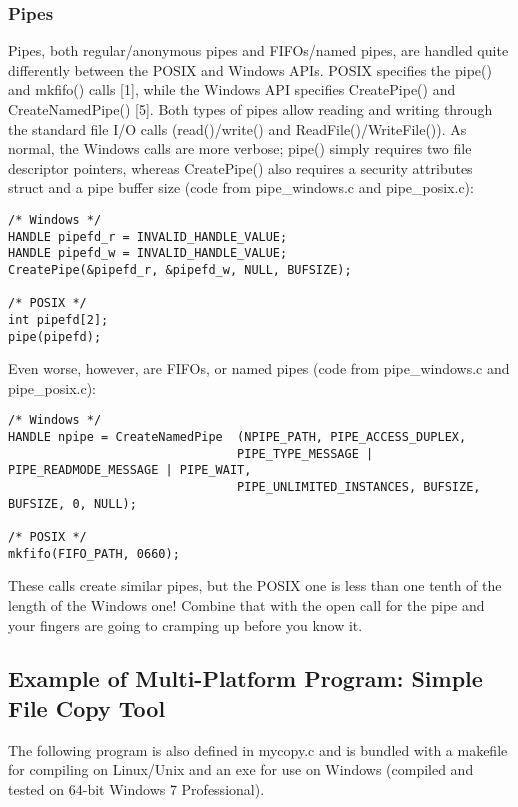 \documentclass[letterpaper,10pt,fleqn]{article}
\numberwithin{equation}{section}
\begin{document}
\subsubsection*{Pipes}
Pipes, both regular/anonymous pipes and FIFOs/named pipes, are handled quite differently between the POSIX and Windows APIs.  POSIX specifies the pipe() and mkfifo() calls {[}1{]}, while the Windows API specifies CreatePipe() and CreateNamedPipe() {[}5{]}.  Both types of pipes allow reading and writing through the standard file I/O calls (read()/write() and ReadFile()/WriteFile()).  As normal, the Windows calls are more verbose; pipe() simply requires two file descriptor pointers, whereas CreatePipe() also requires a security attributes struct and a pipe buffer size (code from pipe\_windows.c and pipe\_posix.c):
\begin{verbatim}
/* Windows */
HANDLE pipefd_r = INVALID_HANDLE_VALUE;
HANDLE pipefd_w = INVALID_HANDLE_VALUE;
CreatePipe(&pipefd_r, &pipefd_w, NULL, BUFSIZE);

/* POSIX */
int pipefd[2];
pipe(pipefd);
\end{verbatim}
Even worse, however, are FIFOs, or named pipes (code from pipe\_windows.c and pipe\_posix.c):
\begin{verbatim}
/* Windows */
HANDLE npipe = CreateNamedPipe  (NPIPE_PATH, PIPE_ACCESS_DUPLEX,
                                PIPE_TYPE_MESSAGE | PIPE_READMODE_MESSAGE | PIPE_WAIT,
                                PIPE_UNLIMITED_INSTANCES, BUFSIZE, BUFSIZE, 0, NULL);

/* POSIX */
mkfifo(FIFO_PATH, 0660);
\end{verbatim}
These calls create similar pipes, but the POSIX one is less than one tenth of the length of the Windows one!  Combine that with the open call for the pipe and your fingers are going to cramping up before you know it.

\subsection*{Example of Multi-Platform Program: Simple File Copy Tool}

The following program is also defined in mycopy.c and is bundled with a makefile for compiling on Linux/Unix and an exe for use on Windows (compiled and tested on 64-bit Windows 7 Professional).
\end{document}
